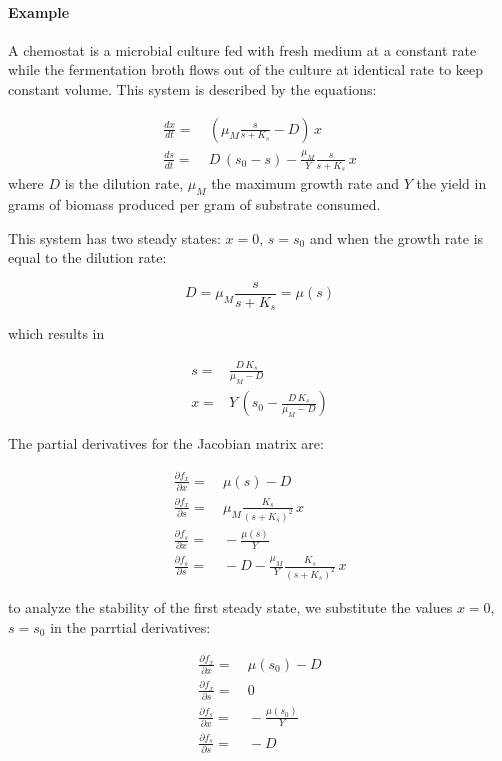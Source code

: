 \documentclass[12pt]{article}
\begin{document}
\paragraph{Example} A chemostat is a microbial culture fed with fresh medium at a constant rate while the fermentation broth flows out of the culture at identical rate to keep constant volume. This system is described by the equations:

\begin{align}
	\frac{dx}{dt}=&\: \left( \mu_M \frac{s}{s+K_s} - D\right) \, x  \nonumber\\
	\frac{ds}{dt}=&\: D\, (s_0-s)-\frac{\mu_M}{Y} \frac{s}{s+K_s}\,x \nonumber
\end{align}
where $D$ is the dilution rate, $\mu_M$ the maximum growth rate and $Y$ the yield in grams of biomass produced per gram of substrate consumed.

This system has two steady states: $x=0$, $s=s_0$ and when the growth rate is equal to the dilution rate:

 \begin{equation}
	D = \mu_M \frac{s}{s+K_s} = \mu(s) \nonumber
\end{equation}

which results in 

\begin{align}
	s=& \frac{D \, K_s}{\mu_M - D} \nonumber \\
	x=& Y \, \left( s_0 - \frac{D \, K_s}{\mu_M - D} \right) \nonumber
\end{align}

The partial derivatives for the Jacobian matrix are:

\begin{align}
	\frac{\partial f_x}{\partial x }=&\:   \mu(s) - D  \nonumber\\
	\frac{\partial f_x}{\partial s }=&\: \mu_M \frac{K_s}{(s+K_s)^2} \, x   \nonumber\\
	\frac{\partial f_s}{\partial x }=&\: - \frac{\mu(s)}{Y}  \nonumber\\
	\frac{\partial f_s}{\partial s }=&\: - D -   \frac{\mu_M}{Y} \frac{K_s}{(s+K_s)^2} \, x  \nonumber
\end{align}

to analyze the stability of the first steady state, we substitute the values $x=0$, $s=s_0$ in the parrtial derivatives:

\begin{align}
	\frac{\partial f_x}{\partial x }=&\:    \mu(s_0) - D  \nonumber\\
	\frac{\partial f_x}{\partial s }=&\: 0  \nonumber\\
	\frac{\partial f_s}{\partial x }=&\:  - \frac{\mu(s_0)}{Y} \nonumber\\
	\frac{\partial f_s}{\partial s }=&\: - D   \nonumber
\end{align}
\end{document}
